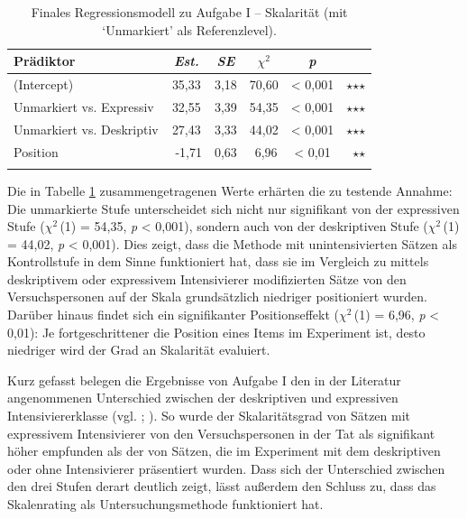 %
\begin{table}
\begin{tabularx}{\textwidth}{Xccccr}
\lsptoprule
Prädiktor & \textit{Est.} & \textit{SE} & \textit{$\chi$$^{2}$} & \textit{p} & \\
\midrule
(Intercept) & 35,33 & 3,18 & 70,60 & < 0,001 & $\star$$\star$$\star$\\
Unmarkiert vs. Expressiv & 32,55 & 3,39 & 54,35 & < 0,001 & $\star$$\star$$\star$\\
Unmarkiert vs. Deskriptiv & 27,43 & 3,33 & 44,02 & < 0,001 & $\star$$\star$$\star$\\
Position & \textcolor{white}{-}-1,71 & 0,63 & \textcolor{white}{-}6,96 & < 0,01 & \multicolumn{1}{r}{$\star$$\star$} \\
\lspbottomrule
\end{tabularx}
\caption[Finales Regressionsmodell zu Aufgabe I von Experiment 1 (mit `Unmarkiert' als Referenzlevel)]{Finales Regressionsmodell zu Aufgabe I -- Skalarität (mit `Unmarkiert' als Referenzlevel).}
\label{LinReg0010}
\end{table}


\noindent Die in Tabelle \ref{LinReg0010} zusammengetragenen Werte erhärten die zu testende Annahme: Die unmarkierte Stufe unterscheidet sich nicht nur signifikant von der expressiven Stufe ($\chi$$^{2}$\,(1) = 54,35, \textit{p} < 0,001), sondern auch von der deskriptiven Stufe ({$\chi$$^{2}$\,(1) = 44,02}, \textit{p} < 0,001). Dies zeigt, dass die Methode mit unintensivierten Sätzen als Kontrollstufe in dem Sinne funktioniert hat, dass sie im Vergleich zu mittels deskriptivem oder expressivem Intensivierer modifizierten Sätze von den Versuchspersonen auf der Skala grundsätzlich niedriger positioniert wurden. Darüber hinaus findet sich ein signifikanter Positionseffekt {($\chi$$^{2}$\,(1) = 6,96}, {\textit{p} < 0,01)}: Je fortgeschrittener die Position eines Items im Experiment ist, desto niedriger wird der Grad an Skalarität evaluiert.


Kurz gefasst belegen die Ergebnisse von Aufgabe I den in der Literatur angenommenen Unterschied zwischen der deskriptiven und expressiven Intensiviererklasse (vgl. \citealt[22]{Paradis.1997}; {\citealt[133]{Gutzmann.2019a}}). So wurde der Skalaritätsgrad von Sätzen mit expressivem Intensivierer von den Versuchspersonen in der Tat als signifikant höher empfunden als der von Sätzen, die im Experiment mit dem deskriptiven oder ohne Intensivierer präsentiert wurden. Dass sich der Unterschied zwischen den drei Stufen derart deutlich zeigt, lässt außerdem den Schluss zu, dass das Skalenrating als Untersuchungsmethode funktioniert hat.


